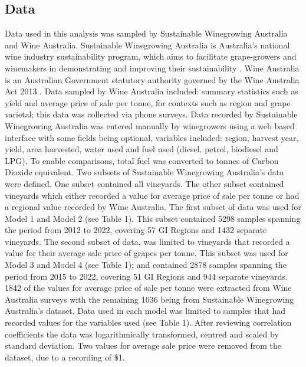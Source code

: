 \documentclass[review,12pt,authoryear]{elsarticle}
\begin{document}
\begin{linenumbers}
\subsection{Data}
Data used in this analysis was sampled by Sustainable Winegrowing Australia and Wine Australia. Sustainable Winegrowing Australia is Australia's national wine industry sustainability program, which aims to facilitate grape-growers and winemakers in demonstrating and improving their sustainability \citep{swaSustainableWingrowingAustralia2022}. Wine Australia is an Australian Government statutory authority governed by the Wine Australia Act 2013 \citep{WineAustraliaAct2019}. 
\newline
Data sampled by Wine Australia included: summary statistics such as yield and average price of sale per tonne, for contexts such as region and grape varietal; this data was collected via phone surveys. Data recorded by Sustainable Winegrowing Australia was entered manually by winegrowers using a web based interface with some fields being optional, variables included: region, harvest year, yield, area harvested, water used and fuel used (diesel, petrol, biodiesel and LPG). To enable comparisons, total fuel was converted to tonnes of Carbon Dioxide equivalent. Two subsets of Sustainable Winegrowing Australia's data were defined. One subset contained all vineyards. The other subset contained vineyards which either recorded a value for average price of sale per tonne or had a regional value recorded by Wine Australia.
\newline
The first subset of data was used for Model 1 and Model 2 (see Table 1). This subset contained 5298 samples spanning the period from 2012 to 2022, covering 57 GI Regions and 1432 separate vineyards.
\newline
The second subset of data, was limited to vineyards that recorded a value for their average sale price of grapes per tonne. This subset was used for Model 3 and Model 4 (see Table 1); and contained 2878 samples spanning the period from 2015 to 2022, covering 51 GI Regions and 944 separate vineyards. 1842 of the values for average price of sale per tonne were extracted from Wine Australia surveys with the remaining 1036 being from Sustainable Winegrowing Australia's dataset.
\newline
Data used in each model was limited to samples that had recorded values for the variables used (see Table 1). After reviewing correlation coefficients the data was logarithmically transformed, centred and scaled by standard deviation. Two values for average sale price were removed from the dataset, due to a recording of \$1. 

\end{linenumbers}
\end{document}
